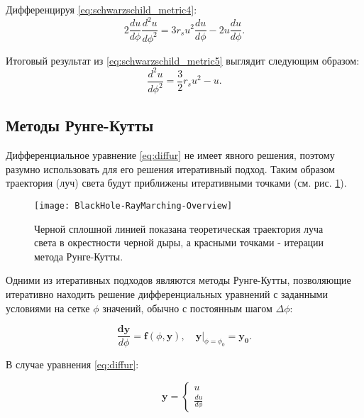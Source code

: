 Дифференцируя \eqref{eq:schwarzschild_metric4}:
\begin{equation}
\label{eq:schwarzschild_metric5}
    2\frac{du}{d\phi}\frac{d^2u}{d\phi^2} = 3r_su^2\frac{du}{d\phi} - 2u\frac{du}{d\phi}.
\end{equation}

Итоговый результат из \eqref{eq:schwarzschild_metric5} выглядит следующим образом:
\begin{equation}
\label{eq:diffur}
    \frac{d^2u}{d\phi^2} = \frac{3}{2}r_su^2 - u.
\end{equation}

\subsection{Методы Рунге-Кутты}
\label{subsec:runge-kutte}

Дифференциальное уравнение \eqref{eq:diffur} не имеет явного решения, поэтому разумно использовать для его решения итеративный подход. Таким образом траектория (луч) света будут приближены итеративными точками (см. рис. \ref{fig:runge-kutte}).

\begin{figure}[h]
    \centering
    \texttt{[image: BlackHole-RayMarching-Overview]}
    \caption{Черной сплошной линией показана теоретическая траектория луча света в окрестности черной дыры, а красными точками - итерации метода Рунге-Кутты.}
    \label{fig:runge-kutte}
\end{figure}

Одними из итеративных подходов являются методы Рунге-Кутты, позволяющие итеративно находить решение дифференциальных уравнений с заданными условиями на сетке $\phi$ значений, обычно с постоянным шагом $\Delta \phi$:

\begin{equation}
\label{eq:runge-kutte}
    \frac{\mathbf{dy}}{d\phi} = \mathbf{f}(\phi, \mathbf{y}),
    \quad
    \left.\mathbf{y}\right|_{\phi=\phi_0}=\mathbf{y_0}.
\end{equation}

В случае уравнения \eqref{eq:diffur}:

\begin{equation*}
\label{eq:runge-kutte_y}
    \mathbf{y} =
    \begin{cases}
        u
        \\
        \frac{du}{d\phi}
    \end{cases}
\end{equation*}

